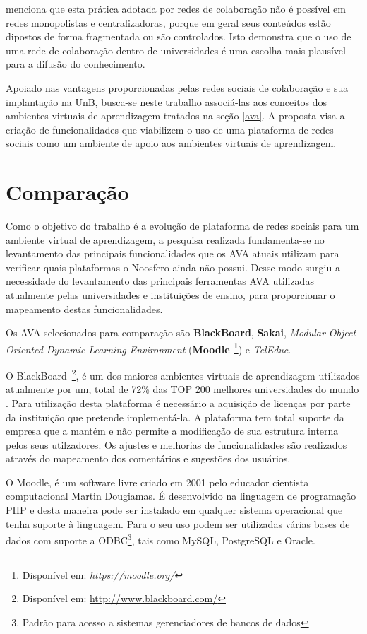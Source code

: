  menciona que esta prática adotada por redes de colaboração não é possível em redes monopolistas e centralizadoras, porque em geral seus conteúdos estão dipostos de forma fragmentada ou são controlados. Isto demonstra que o uso de uma rede de colaboração dentro de universidades é uma escolha mais plausível para a difusão do conhecimento.

Apoiado nas vantagens proporcionadas pelas redes sociais de colaboração e sua implantação na UnB, busca-se neste trabalho associá-las aos conceitos dos ambientes virtuais de aprendizagem tratados na seção \ref{ava}. A proposta visa a criação de funcionalidades que viabilizem o uso de uma plataforma de redes sociais como um ambiente de apoio aos ambientes virtuais de aprendizagem.

\section{Comparação}
\label{comparacao-ava}

Como o objetivo do trabalho é a evolução de plataforma de redes sociais para um ambiente virtual de aprendizagem, a pesquisa realizada fundamenta-se no levantamento das principais funcionalidades que os AVA atuais utilizam para verificar quais plataformas o Noosfero ainda não possui. Desse modo surgiu a necessidade do levantamento das principais ferramentas AVA utilizadas atualmente pelas universidades e instituições de ensino, para proporcionar o mapeamento destas funcionalidades.

Os AVA selecionados para comparação são \textbf{BlackBoard}, \textbf{Sakai}, \textit{Modular Object-Oriented Dynamic Learning Environment} (\textbf{Moodle \footnote{Disponível em: \textit{ \url{https://moodle.org/}}}}) e \textit{TelEduc}.

O BlackBoard~\footnote{Disponível em: \url{http://www.blackboard.com/}}, é um dos maiores ambientes virtuais de aprendizagem utilizados atualmente por um, total de 72\% das TOP 200 melhores universidades do mundo \cite{blackboard}. Para utilização desta plataforma é necessário a aquisição de licenças por parte da instituição que pretende implementá-la. A plataforma tem total suporte da empresa que a mantém e não permite a modificação de sua estrutura interna pelos seus utilzadores. Os ajustes e melhorias de funcionalidades são realizados através do mapeamento dos comentários e sugestões dos usuários.

O Moodle, é um software livre criado em 2001 pelo educador cientista computacional Martin Dougiamas. É desenvolvido na linguagem de programação PHP e desta maneira pode ser instalado em qualquer sistema operacional que tenha suporte à linguagem. Para o seu uso podem ser utilizadas várias bases de dados com suporte a ODBC\footnote{Padrão para acesso a sistemas gerenciadores de bancos de dados}, tais como MySQL, PostgreSQL e Oracle.


